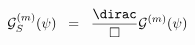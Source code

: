 \begin{equation}
   {\cal{G}}^{(m)}_S ( \psi ) \;\; =\;\;  {\dirac \over
\square} {\cal{G}}^{(m)} ( \psi
)
\label{eq:3.11a}
\end{equation}

